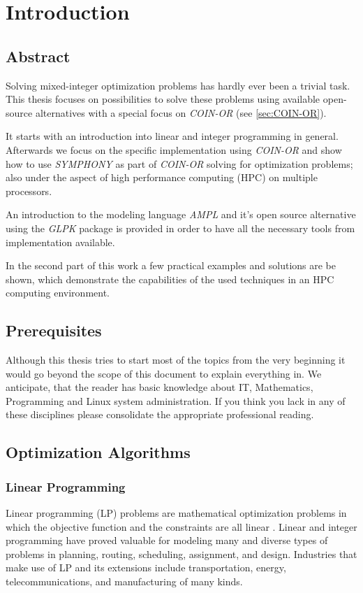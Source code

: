 \chapter{Introduction}
\label{sec:Introduction}

\section{Abstract}
\label{sec:Abstract}

Solving mixed-integer optimization problems has hardly ever been a trivial task.
This thesis focuses on possibilities to solve these problems using available open-source alternatives with a special focus on \textit{COIN-OR} (see \ref{sec:COIN-OR}).

It starts with an introduction into linear and integer programming in general.
Afterwards we focus on the specific implementation using 
\textit{COIN-OR} 
and show how to use  
\textit{SYMPHONY} as part of \textit{COIN-OR}
solving for optimization problems; also under the aspect of high performance computing (HPC) on multiple processors.

An introduction to the modeling language \textit{AMPL} and it's open source alternative using the \textit{GLPK} package is provided in order to have all the necessary tools from implementation available.

In the second part of this work a few practical examples and solutions are be shown, which demonstrate the capabilities of the used techniques in an HPC computing environment.

\section{Prerequisites}
\label{sec:Prerequisites}

Although this thesis tries to start most of the topics from the very beginning it would go beyond the scope of this document to explain everything in.
We anticipate, that the reader has basic knowledge about IT, Mathematics, Programming and Linux system administration.
If you think you lack in any of these disciplines please consolidate the appropriate professional reading. 

\section{Optimization Algorithms}
\subsection{Linear Programming}
Linear programming (LP) problems are mathematical optimization problems in which the objective function and the constraints are all linear \citep{luenberger2003lan}.
Linear and integer programming have proved valuable for modeling many and diverse types of problems in planning, routing, scheduling, assignment, and design. Industries that make use of LP and its extensions include transportation, energy, telecommunications, and manufacturing of many kinds.

